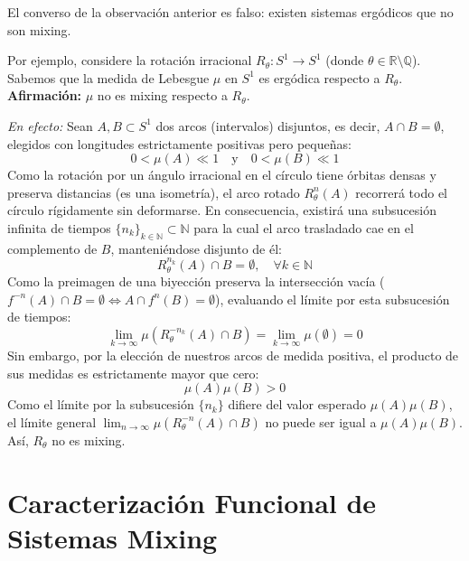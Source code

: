 \begin{observacion}
	El converso de la observación anterior es falso: existen sistemas ergódicos que no son mixing.
	
	Por ejemplo, considere la rotación irracional $R_\theta: S^1 \to S^1$ (donde $\theta \in \mathbb{R} \setminus \mathbb{Q}$). Sabemos que la medida de Lebesgue $\mu$ en $S^1$ es ergódica respecto a $R_\theta$.
	\textbf{Afirmación:} $\mu$ no es mixing respecto a $R_\theta$.
	
	\textit{En efecto:} Sean $A, B \subset S^1$ dos arcos (intervalos) disjuntos, es decir, $A \cap B = \emptyset$, elegidos con longitudes estrictamente positivas pero pequeñas:
	$$ 0 < \mu(A) \ll 1 \quad \text{y} \quad 0 < \mu(B) \ll 1 $$
	Como la rotación por un ángulo irracional en el círculo tiene órbitas densas y preserva distancias (es una isometría), el arco rotado $R_\theta^n(A)$ recorrerá todo el círculo rígidamente sin deformarse. En consecuencia, existirá una subsucesión infinita de tiempos $\{n_k\}_{k \in \mathbb{N}} \subset \mathbb{N}$ para la cual el arco trasladado cae en el complemento de $B$, manteniéndose disjunto de él:
	$$ R_\theta^{n_k}(A) \cap B = \emptyset, \quad \forall k \in \mathbb{N} $$
	Como la preimagen de una biyección preserva la intersección vacía ($f^{-n}(A) \cap B = \emptyset \iff A \cap f^n(B) = \emptyset$), evaluando el límite por esta subsucesión de tiempos:
	$$ \lim_{k \to \infty} \mu(R_\theta^{-n_k}(A) \cap B) = \lim_{k \to \infty} \mu(\emptyset) = 0 $$
	Sin embargo, por la elección de nuestros arcos de medida positiva, el producto de sus medidas es estrictamente mayor que cero:
	$$ \mu(A)\mu(B) > 0 $$
	Como el límite por la subsucesión $\{n_k\}$ difiere del valor esperado $\mu(A)\mu(B)$, el límite general $\lim_{n \to \infty} \mu(R_\theta^{-n}(A) \cap B)$ no puede ser igual a $\mu(A)\mu(B)$. Así, $R_\theta$ no es mixing.
\end{observacion}

\section{Caracterización Funcional de Sistemas Mixing}

